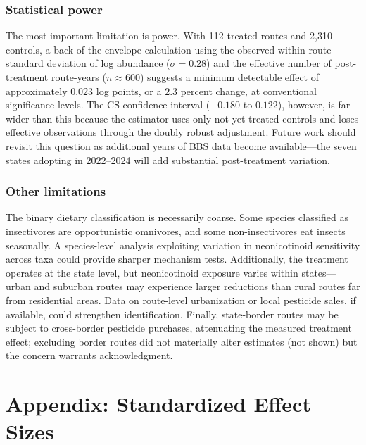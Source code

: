 \documentclass[12pt]{article}
\begin{document}
\subsubsection*{Statistical power} The most important limitation is power. With 112 treated routes and 2,310 controls, a back-of-the-envelope calculation using the observed within-route standard deviation of log abundance ($\sigma = 0.28$) and the effective number of post-treatment route-years ($n \approx 600$) suggests a minimum detectable effect of approximately $0.023$ log points, or a 2.3 percent change, at conventional significance levels. The CS confidence interval ($-0.180$ to $0.122$), however, is far wider than this because the estimator uses only not-yet-treated controls and loses effective observations through the doubly robust adjustment. Future work should revisit this question as additional years of BBS data become available---the seven states adopting in 2022--2024 will add substantial post-treatment variation.

\subsubsection*{Other limitations} The binary dietary classification is necessarily coarse. Some species classified as insectivores are opportunistic omnivores, and some non-insectivores eat insects seasonally. A species-level analysis exploiting variation in neonicotinoid sensitivity across taxa could provide sharper mechanism tests. Additionally, the treatment operates at the state level, but neonicotinoid exposure varies within states---urban and suburban routes may experience larger reductions than rural routes far from residential areas. Data on route-level urbanization or local pesticide sales, if available, could strengthen identification. Finally, state-border routes may be subject to cross-border pesticide purchases, attenuating the measured treatment effect; excluding border routes did not materially alter estimates (not shown) but the concern warrants acknowledgment.

\label{apep_main_text_end}


\newpage



\newpage
\appendix
\section*{Appendix: Standardized Effect Sizes}



\clearpage

\clearpage

\clearpage

\clearpage

\clearpage

\end{document}
